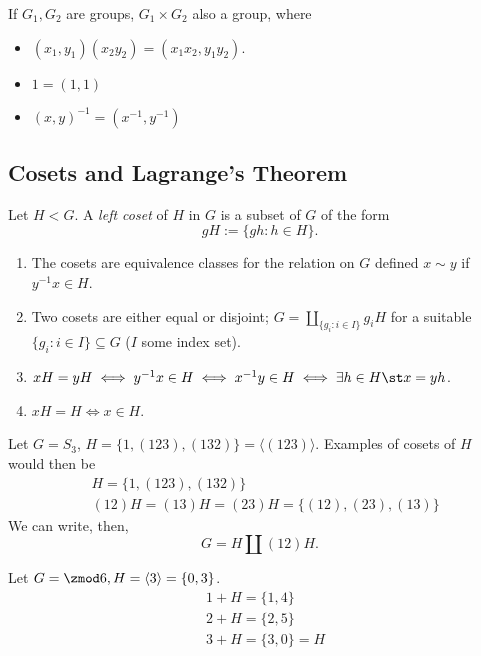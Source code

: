 \documentclass[12pt,oneside]{article}
\begin{document}
\begin{definition}
  If $G_1, G_2$ are groups, $G_1 \times G_2$ also a group, where 
  \begin{itemize}
    \item $(x_1, y_1)(x_2y_2) = (x_1x_2, y_1y_2)$. 
    \item $1 = (1,1)$
    \item $(x,y)^{-1} = (x^{-1}, y^{-1})$
  \end{itemize}
\end{definition}

\newpage
\subsection{Cosets and Lagrange's Theorem}

\begin{definition}
  Let $H < G$. A \emph{left coset} of $H$ in $G$ is a subset of $G$ of the form $$gH := \{g h : h \in H \}.$$
\end{definition}

\begin{lemma}\label{lemma:cosets1}
  \begin{enumerate}
    \item The cosets are equivalence classes for the relation on $G$ defined $x \sim y$ if $y^{-1}x \in H$.
    \item Two cosets are either equal or disjoint; $G = \amalg_{\{g_i : i \in I\}} g_i H$ for a suitable $\{g_i : i \in I\} \subseteq G$ ($I$ some index set).
    \item $xH = yH \iff y^{-1}x \in H \iff x^{-1}y \in H \iff \exists h \in H \st x = yh$.
    \item $xH = H \iff x \in H$.
  \end{enumerate}
\end{lemma}

\begin{example}[$S_3$]
  Let $G = S_3$, $H = \{1, (123), (132)\} = \langle (123)\rangle$. Examples of cosets of $H$ would then be \begin{align*}
    &H = \{1, (123), (132)\}\\
    &(12)H = (13)H = (23)H = \{(12), (23), (13)\}
  \end{align*}
  We can write, then,
  \[
  G = H \amalg (12)H.
  \]
\end{example}

\begin{example}
  Let $G = \zmod 6, H = \langle 3 \rangle = \{0, 3\}$. \begin{align*}
    &1 + H = \{1, 4\}\\
    &2 + H = \{2, 5\}\\
    &3 + H = \{3, 0\} = H
  \end{align*}
\end{example}
\end{document}
